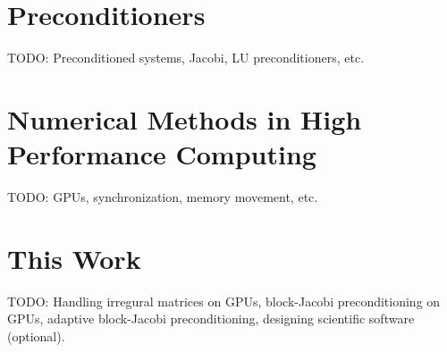 



\section{Preconditioners}
TODO: Preconditioned systems, Jacobi, LU preconditioners, etc.

\section{Numerical Methods in High Performance Computing}
TODO: GPUs, synchronization, memory movement, etc.

\section{This Work}
TODO: Handling irregural matrices on GPUs, block-Jacobi preconditioning on GPUs,
      adaptive block-Jacobi preconditioning, designing scientific software
      (optional).
